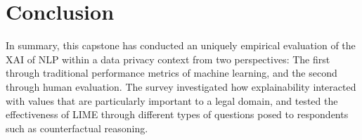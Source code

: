 \chapter{Conclusion} %
\label{chapter5} %

In summary, this capstone has conducted an uniquely empirical evaluation of the XAI of NLP within a data privacy context from two perspectives: The first through traditional performance metrics of machine learning, and the second through human evaluation. The survey investigated how explainability interacted with values that are particularly important to a legal domain, and tested the effectiveness of LIME through different types of questions posed to respondents such as counterfactual reasoning.

